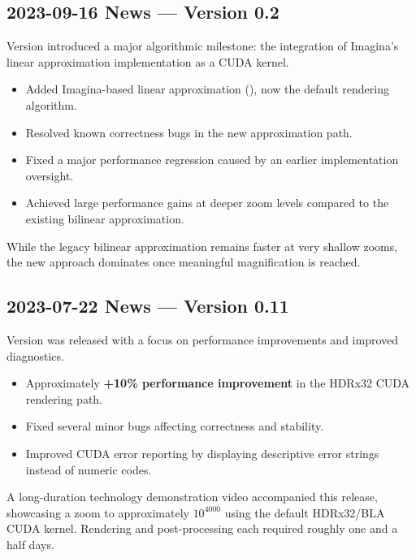 \subsection{2023-09-16 News --- Version 0.2}

Version  introduced a major algorithmic milestone: the integration
of Imagina's linear approximation implementation as a CUDA kernel.

\begin{itemize}
  \item Added Imagina-based linear approximation (), now the
  default rendering algorithm.
  \item Resolved known correctness bugs in the new approximation path.
  \item Fixed a major performance regression caused by an earlier implementation oversight.
  \item Achieved large performance gains at deeper zoom levels compared to the
  existing bilinear approximation.
\end{itemize}

While the legacy bilinear approximation remains faster at very shallow zooms,
the new approach dominates once meaningful magnification is reached.


\subsection{2023-07-22 News --- Version 0.11}

Version  was released with a focus on performance improvements and
improved diagnostics.

\begin{itemize}
  \item Approximately \textbf{+10\% performance improvement} in the HDRx32 CUDA
  rendering path.
  \item Fixed several minor bugs affecting correctness and stability.
  \item Improved CUDA error reporting by displaying descriptive error strings
  instead of numeric codes.
\end{itemize}

A long-duration technology demonstration video accompanied this release,
showcasing a zoom to approximately $10^{4000}$ using the default HDRx32/BLA CUDA
kernel.  Rendering and post-processing each required roughly one and a half
days.


